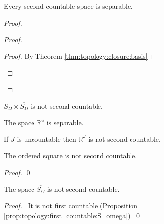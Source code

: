   \begin{thm}[CC]
 Every second countable space is separable.
\end{thm}

\begin{proof}
 \pf
 \begin{proof}
   \qedstep
   \begin{proof}
     \pf By Theorem \ref{thm:topology:closure:basis}
   \end{proof}
 \end{proof}
\end{proof}

\begin{cor}
  $S_\Omega \times \overline{S_\Omega}$ is not second countable.
\end{cor}

\begin{cor}
  The space $\mathbb{R}^\omega$ is separable.
\end{cor}

\begin{cor}
If $J$ is uncountable then $\mathbb{R}^J$ is not second countable.
\end{cor}

  \begin{prop}
 The ordered square is not second countable.
\end{prop}

\begin{proof}
 \pf
 \qed
\end{proof}

\begin{prop}
  The space $\overline{S_\Omega}$ is not second countable.
\end{prop}

\begin{proof}
  \pf\ It is not first countable (Proposition
  \ref{prop:topology:first_countable:S_omega}). \qed
\end{proof}

